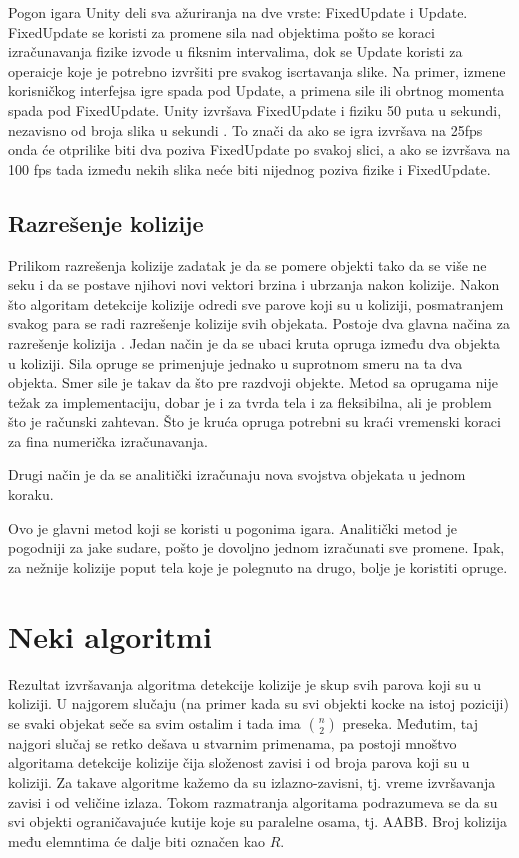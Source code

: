 \documentclass{article}
\begin{document}
{Pogon igara Unity deli sva ažuriranja na dve vrste: FixedUpdate i Update. 
FixedUpdate se koristi za promene sila nad objektima pošto se koraci izračunavanja fizike izvode u fiksnim intervalima, 
dok se Update koristi za operaicje koje je potrebno izvršiti pre svakog iscrtavanja slike. 
Na primer, izmene korisničkog interfejsa igre spada pod Update, a primena sile ili obrtnog momenta spada pod FixedUpdate.
Unity izvršava FixedUpdate i fiziku 50 puta u sekundi, nezavisno od broja slika u sekundi \cite{unity}.
To znači da ako se igra izvršava na 25fps onda će otprilike biti dva poziva FixedUpdate po svakoj slici,
a ako se izvršava na 100 fps tada između nekih slika neće biti nijednog poziva fizike i FixedUpdate.

\subsection{Razrešenje kolizije}

Prilikom razrešenja kolizije zadatak je da se pomere objekti tako da se više ne seku i
da se postave njihovi novi vektori brzina i ubrzanja nakon kolizije.
Nakon što algoritam detekcije kolizije odredi sve parove koji su u koliziji, 
posmatranjem svakog para se radi razrešenje kolizije svih objekata.
Postoje dva glavna načina za razrešenje kolizija \cite{Moore}.
Jedan način je da se ubaci kruta opruga između dva objekta u koliziji.
Sila opruge se primenjuje jednako u suprotnom smeru na ta dva objekta.
Smer sile je takav da što pre razdvoji objekte. Metod sa oprugama nije težak 
za implementaciju, dobar je i za tvrda tela i za fleksibilna, ali je problem što je 
računski zahtevan. Što je kruća opruga potrebni su kraći vremenski koraci za fina 
numerička izračunavanja.

Drugi način je da se analitički izračunaju nova svojstva objekata u jednom koraku.

Ovo je glavni metod koji se koristi u pogonima igara.
Analitički metod je pogodniji za jake sudare, pošto je dovoljno jednom izračunati sve promene.
Ipak, za nežnije kolizije poput tela koje je polegnuto na drugo, bolje je koristiti opruge.



\section{Neki algoritmi}
\label{sec:algoritmi}

Rezultat izvršavanja algoritma detekcije kolizije je skup svih parova koji su u koliziji.
U najgorem slučaju (na primer kada su svi objekti kocke na istoj poziciji) se svaki objekat
seče sa svim ostalim i tada ima $ {n\choose 2}  $ preseka. Međutim, taj najgori slučaj se retko dešava
u stvarnim primenama, pa postoji mnoštvo algoritama detekcije kolizije čija složenost zavisi i od broja
parova koji su u koliziji. Za takave algoritme kažemo da su izlazno-zavisni, tj.
vreme izvršavanja zavisi i od veličine izlaza. Tokom razmatranja algoritama podrazumeva se da su svi
objekti ograničavajuće kutije koje su paralelne osama, tj. AABB.
Broj kolizija među elemntima će dalje biti označen kao $R$. 

}
\end{document}
